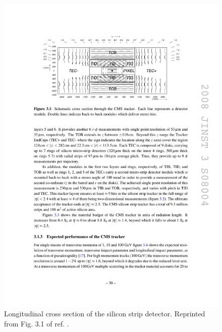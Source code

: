 \documentclass[dissertation.tex]{subfiles}
\begin{document}
\begin{figure}
	\centering
	\includegraphics[scale=1.0]{strip_longitudinal_xsec}
	\caption{Longitudinal cross section of the silicon strip detector.  Reprinted from Fig. 3.1 of ref. \cite{1748-0221-3-08-S08004}.}
	\label{fig:strip_longitudinal_xsec}
\end{figure}
\end{document}
